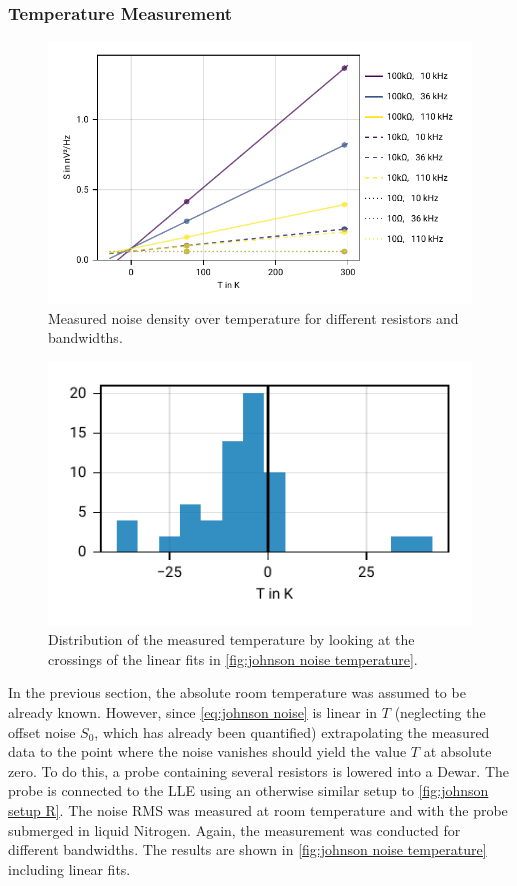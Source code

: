 \documentclass[
    parskip=half, 
    twoside=false,
    twocolumn=true,
    fontsize=11pt,
]{scrarticle}
\begin{document}
\subsubsection*{Temperature Measurement}
\begin{figure}[h!]
    \centering
    \includegraphics{figures/02 temperature.pdf}
    \caption{
        Measured noise density over temperature for different resistors and bandwidths.
    }
    \label{fig:johnson noise temperature}
\end{figure}
\begin{figure}[h!]
    \centering
    \includegraphics{figures/02 temperature distribution.pdf}
    \caption{
        Distribution of the measured temperature by looking at the crossings of the linear fits in \autoref{fig:johnson noise temperature}.
    }
    \label{fig:johnson noise temperature distribution}
\end{figure}
In the previous section, the absolute room temperature was assumed to be already known. However, since \autoref{eq:johnson noise} is linear in $T$ (neglecting the offset noise $S_0$, which has already been quantified) extrapolating the measured data to the point where the noise vanishes should yield the value $T$ at absolute zero. To do this, a probe containing several resistors is lowered into a Dewar. The probe is connected to the LLE using an otherwise similar setup to \autoref{fig:johnson setup R}. The noise RMS was measured at room temperature and with the probe submerged in liquid Nitrogen. Again, the measurement was conducted for different bandwidths. The results are shown in \autoref{fig:johnson noise temperature} including linear fits.
\end{document}
